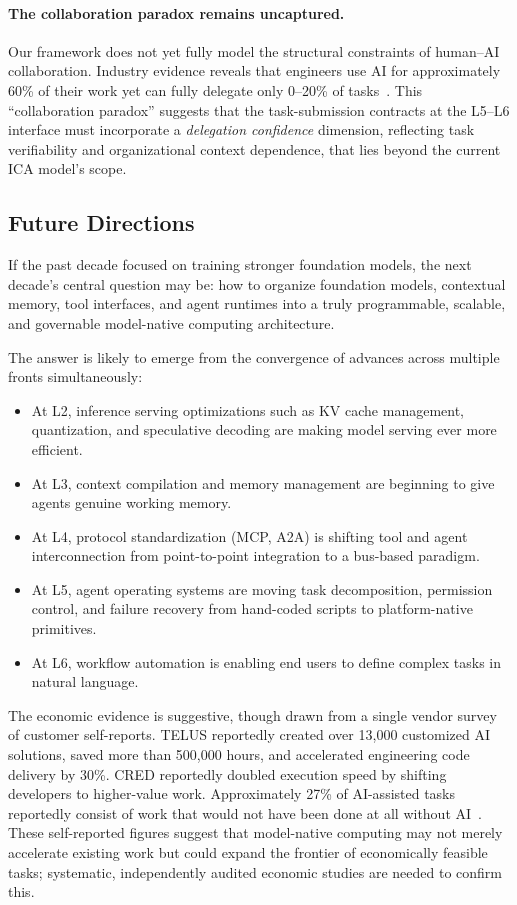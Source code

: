 \paragraph{The collaboration paradox remains uncaptured.}
Our framework does not yet fully model the structural constraints of human--AI collaboration. Industry evidence reveals that engineers use AI for approximately 60\% of their work yet can fully delegate only 0--20\% of tasks~\cite{anthropic2026agenticreport}. This ``collaboration paradox'' suggests that the task-submission contracts at the L5--L6 interface must incorporate a \emph{delegation confidence} dimension, reflecting task verifiability and organizational context dependence, that lies beyond the current ICA model's scope.

\subsection{Future Directions}

If the past decade focused on training stronger foundation models, the next decade's central question may be: how to organize foundation models, contextual memory, tool interfaces, and agent runtimes into a truly programmable, scalable, and governable model-native computing architecture.

The answer is likely to emerge from the convergence of advances across multiple fronts simultaneously:
\begin{itemize}[nosep]
    \item At L2, inference serving optimizations such as KV cache management, quantization, and speculative decoding are making model serving ever more efficient.
    \item At L3, context compilation and memory management are beginning to give agents genuine working memory.
    \item At L4, protocol standardization (MCP, A2A) is shifting tool and agent interconnection from point-to-point integration to a bus-based paradigm.
    \item At L5, agent operating systems are moving task decomposition, permission control, and failure recovery from hand-coded scripts to platform-native primitives.
    \item At L6, workflow automation is enabling end users to define complex tasks in natural language.
\end{itemize}

The economic evidence is suggestive, though drawn from a single vendor survey of customer self-reports. TELUS reportedly created over 13,000 customized AI solutions, saved more than 500,000 hours, and accelerated engineering code delivery by 30\%. CRED reportedly doubled execution speed by shifting developers to higher-value work. Approximately 27\% of AI-assisted tasks reportedly consist of work that would not have been done at all without AI~\cite{anthropic2026agenticreport}. These self-reported figures suggest that model-native computing may not merely accelerate existing work but could expand the frontier of economically feasible tasks; systematic, independently audited economic studies are needed to confirm this.

